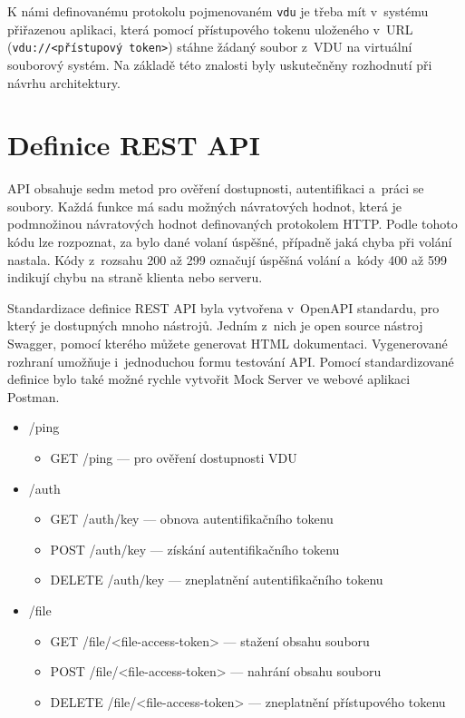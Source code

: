 K námi definovanému protokolu pojmenovaném \texttt{vdu} je třeba mít v systému přiřazenou aplikaci, která pomocí přístupového tokenu uloženého v URL 
(\texttt{\mbox{vdu://<přístupový token>}}) stáhne žádaný soubor z VDU na virtuální souborový systém. Na základě této znalosti byly uskutečněny rozhodnutí při návrhu architektury.
 
\section{Definice REST API}

API obsahuje sedm metod pro ověření dostupnosti, autentifikaci a práci se soubory. Každá funkce má sadu možných návratových hodnot, která je podmnožinou návratových hodnot
definovaných protokolem HTTP. Podle tohoto kódu lze rozpoznat, za bylo dané volaní úspěšné, případně jaká chyba při volání nastala. Kódy z rozsahu 200 až 299 označují
úspěšná volání a kódy 400 až 599 indikují chybu na straně klienta nebo serveru.

Standardizace definice REST API byla vytvořena v OpenAPI standardu, pro který je dostupných mnoho nástrojů. Jedním z nich je open source nástroj Swagger, pomocí kterého
můžete generovat HTML dokumentaci. Vygenerované rozhraní umožňuje i jednoduchou formu testování API. Pomocí standardizované definice bylo také možné rychle vytvořit 
Mock Server ve webové aplikaci Postman.

\begin{itemize}
    \item /ping
    \begin{itemize}
        \item GET /ping — pro ověření dostupnosti VDU        
    \end{itemize}
    \item /auth
    \begin{itemize}
        \item GET /auth/key — obnova autentifikačního tokenu
        \item POST /auth/key — získání autentifikačního tokenu
        \item DELETE /auth/key — zneplatnění autentifikačního tokenu
    \end{itemize}
    \item /file
    \begin{itemize}
        \item GET /file/<file-access-token> — stažení obsahu souboru
        \item POST /file/<file-access-token> — nahrání obsahu souboru
        \item DELETE /file/<file-access-token> — zneplatnění přístupového tokenu
    \end{itemize}
\end{itemize}

